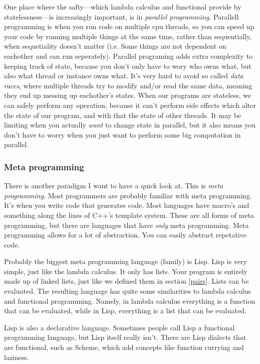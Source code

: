 \documentclass[11pt]{article}
\begin{document}
One place where the safty---which lambda calculus and functional provide by
statelessness---is increasingly important, is in \emph{parallel programming}.
Parallell programming is when you run code on multiple cpu threads, so you can
speed up your code by running multiple things at the same time, rather than
sequentially, when sequetiality doesn't matter (i.e. Some things are not
dependent on eachother and can run seperately). Parallel programing adds extra
complexity to keeping track of state, because you don't only have to wory who
owns what, but also what thread or instance owns what. It's very hard to avoid
so called \emph{data races}, where multiple threads try to modify and/or read
the same data, meaning they end up messing up eachother's states. When our
programs are stateless, we can safely perform any operation, because it can't
perform side effects which alter the state of our program, and with that the
state of other threads. It may be limiting when you actually \emph{want} to
change state in parallel, but it also means you don't have to worry when you
just want to perform some big computation in parallel.

\subsubsection{Meta programming}\label{metaprogramming}

There is another paradigm I want to have a quick look at. This is \emph{meta
programming}. Most programmers are probably familiar with meta programming.
It's when you write code that generates code. Most languages have macro's and
something along the lines of C++'s template system. These are all forms of meta
programming, but there are languages that have \emph{only} meta programming.
Meta programming allows for a lot of abstraction. You can easily abstract
repetative code.

Probably the biggest meta programming language (family) is Lisp. Lisp is very
simple, just like the lambda calculus. It only has lists. Your program is
entirely made up of linked lists, just like we defined them in section
\ref{pairs}. Lists can be evaluated. The resulting language has quite some
similarities to lambda calculus and functional programming. Namely, in lambda
calculus everything is a function that can be evaluated, while in Lisp,
everything is a list that can be evaluated.

Lisp is also a declarative language. Sometimes people call Lisp a functional
programming language, but Lisp itself really isn't. There are Lisp dialects
that are functional, such as Scheme, which add concepts like function currying
and laziness.
\end{document}
